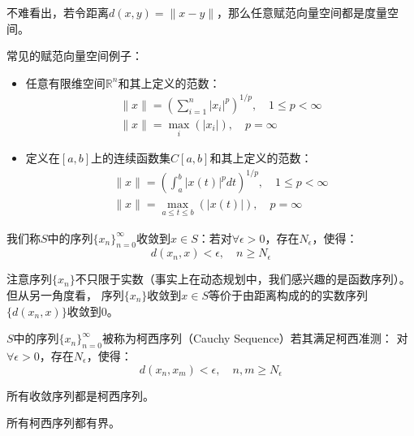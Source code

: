 不难看出，若令距离$d\left(x,y\right)=\|x-y\|$，那么任意赋范向量空间都是度量空间。
\begin{example}
    常见的赋范向量空间例子：
    \begin{itemize}
        \item 任意有限维空间$\mathbb{R}^n$和其上定义的范数：
            \begin{gather*}
                \|x\|=\left(\sum_{i=1}^{n}|x_i|^p\right)^{1/p}, \quad 1\leq p < \infty \\
                \|x\|=\max_{i}\left(|x_i|\right), \quad p=\infty
            \end{gather*}
        \item 定义在$\left[a,b\right]$上的连续函数集$C\left[a,b\right]$和其上定义的范数：     
            \begin{gather*}
                \|x\|=\left(\int_{a}^{b}|x\left(t\right)|^{p}dt\right)^{1/p}, \quad 1 \leq p < \infty \\
                \|x\|=\max _{a\leq t \leq b}\left(|x\left(t\right)|\right), \quad p = \infty
            \end{gather*}
    \end{itemize}
\end{example}

\begin{definition}
    我们称$S$中的序列$\{x_n\}_{n=0}^{\infty}$收敛到$x\in S$：若对$\forall \epsilon > 0$，存在$N_{\epsilon}$，使得：
    \begin{equation*}
        d\left(x_n,x\right)<\epsilon, \quad n\geq N_{\epsilon}
    \end{equation*}
\end{definition}

注意序列$\{x_n\}$不只限于实数（事实上在动态规划中，我们感兴趣的是函数序列）。但从另一角度看，
序列$\{x_n\}$收敛到$x \in S$等价于由距离构成的的实数序列$\{d\left(x_n,x\right)\}$收敛到0。
\begin{definition}
    $S$中的序列$\{x_n\}_{n=0}^{\infty}$被称为柯西序列（Cauchy Sequence）若其满足柯西准测：
    对$\forall \epsilon > 0$，存在$N_{\epsilon}$，使得：
    \begin{equation*}
        d\left(x_n,x_m\right) < \epsilon, \quad n,m \geq N_{\epsilon}
    \end{equation*}
\end{definition}
\begin{theorem}
    所有收敛序列都是柯西序列。
\end{theorem}
\begin{theorem}
    所有柯西序列都有界。
\end{theorem}

